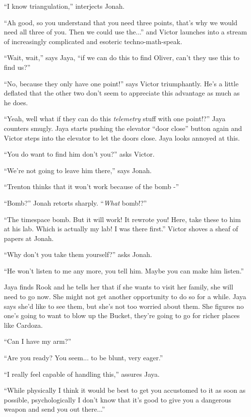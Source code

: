``I know triangulation,'' interjects Jonah.

``Ah good, so you understand that you need three points, that's why we would need all three of you.  Then we could use the...'' and Victor launches into a stream of increasingly complicated and esoteric techno-math-speak.

``Wait, wait,'' says Jaya, ``if we can do this to find Oliver, can't they use this to find us?''

``No, because they only have one point!'' says Victor triumphantly.  He's a little deflated that the other two don't seem to appreciate this advantage as much as he does.

``Yeah, well what if they can do this \textit{telemetry} stuff with one point!?'' Jaya counters smugly. Jaya starts pushing the elevator ``door close'' button again and Victor steps into the elevator to let the doors close. Jaya looks annoyed at this.

``You do want to find him don't you?'' asks Victor.

``We're not going to leave him there,'' says Jonah.

``Trenton thinks that it won't work because of the bomb -''

``Bomb?'' Jonah retorts sharply.  ``\textit{What} bomb!?''

``The timespace bomb.  But it will work!  It rewrote you!  Here, take these to him at his lab.  Which is actually my lab!  I was there first.'' Victor shoves a sheaf of papers at Jonah.

``Why don't you take them yourself?'' asks Jonah.

``He won't listen to me any more, you tell him.  Maybe you can make him listen.''



Jaya finds Rook and he tells her that if she wants to visit her family, she will need to go now.  She might not get another opportunity to do so for a while.  Jaya says she'd like to see them, but she's not too worried about them.  She figures no one's going to want to blow up the Bucket, they're going to go for richer places like Cardoza.  

``Can I have my arm?''

``Are you ready?  You seem... to be blunt, very eager.''

``I really feel capable of handling this,'' assures Jaya.

``While physically I think it would be best to get you accustomed to it as soon as possible, psychologically I don't know that it's good to give you a dangerous weapon and send you out there...''


